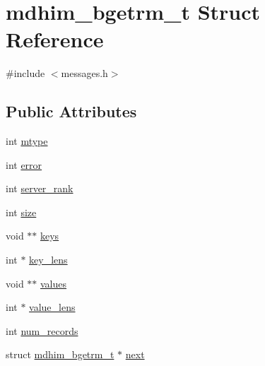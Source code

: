 \hypertarget{structmdhim__bgetrm__t}{\section{mdhim\-\_\-bgetrm\-\_\-t Struct Reference}
\label{structmdhim__bgetrm__t}
}


{\ttfamily \#include $<$messages.\-h$>$}

\subsection*{Public Attributes}
\begin{DoxyCompactItemize}
\item 
int \hyperlink{structmdhim__bgetrm__t_a6d1d78bcd4d55f5341f543246a7636c6}{mtype}
\item 
int \hyperlink{structmdhim__bgetrm__t_a42d5a4b81bd9817f4c31348525d53e37}{error}
\item 
int \hyperlink{structmdhim__bgetrm__t_a3113667adc0eafe85d22c273766bce7f}{server\-\_\-rank}
\item 
int \hyperlink{structmdhim__bgetrm__t_a18bb77da1f9fa807514b7449057157f4}{size}
\item 
void $\ast$$\ast$ \hyperlink{structmdhim__bgetrm__t_adb7029ca1238649fc6b838e21dc1e1fc}{keys}
\item 
int $\ast$ \hyperlink{structmdhim__bgetrm__t_a4edb37ec3da3413607e3eeda3f224525}{key\-\_\-lens}
\item 
void $\ast$$\ast$ \hyperlink{structmdhim__bgetrm__t_a322850d7fda46b0c170ca98342a81779}{values}
\item 
int $\ast$ \hyperlink{structmdhim__bgetrm__t_add99791a3bc82e16120388d1dc0f3ba7}{value\-\_\-lens}
\item 
int \hyperlink{structmdhim__bgetrm__t_a3d398b31f450603e67b854ab563180e8}{num\-\_\-records}
\item 
struct \hyperlink{structmdhim__bgetrm__t}{mdhim\-\_\-bgetrm\-\_\-t} $\ast$ \hyperlink{structmdhim__bgetrm__t_aeb24801d3c8827a0ca7611312e28e568}{next}
\end{DoxyCompactItemize}


